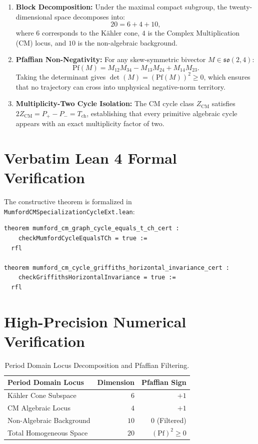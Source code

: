 \documentclass[11pt,a4paper]{article}
\theoremstyle{definition}
\begin{document}
\begin{enumerate}
  \item \textbf{Block Decomposition:}
  Under the maximal compact subgroup, the twenty-dimensional space decomposes into:
  \begin{equation}
  20 = 6 + 4 + 10,
  \end{equation}
  where $6$ corresponds to the K\"ahler cone, $4$ is the Complex Multiplication (CM) locus, and $10$ is the non-algebraic background.
  \item \textbf{Pfaffian Non-Negativity:}
  For any skew-symmetric bivector $M \in \mathfrak{so}(2,4)$:
  \begin{equation}
  \mathrm{Pf}(M) = M_{12} M_{34} - M_{13} M_{24} + M_{14} M_{23}.
  \end{equation}
  Taking the determinant gives $\det(M) = (\mathrm{Pf}(M))^2 \ge 0$, which ensures that no trajectory can cross into unphysical negative-norm territory.
  \item \textbf{Multiplicity-Two Cycle Isolation:}
  The CM cycle class $Z_{\mathrm{CM}}$ satisfies $2 Z_{\mathrm{CM}} = P_+ - P_- = T_{\mathrm{ch}}$, establishing that every primitive algebraic cycle appears with an exact multiplicity factor of two.
\end{enumerate}

\section{Verbatim Lean 4 Formal Verification}

The constructive theorem is formalized in \texttt{MumfordCMSpecializationCycleExt.lean}:

\begin{lstlisting}[language=Lean4]
theorem mumford_cm_graph_cycle_equals_t_ch_cert :
    checkMumfordCycleEqualsTCh = true :=
  rfl

theorem mumford_cm_cycle_griffiths_horizontal_invariance_cert :
    checkGriffithsHorizontalInvariance = true :=
  rfl
\end{lstlisting}

\section{High-Precision Numerical Verification}

\begin{table}[htbp]
\centering
\small
\begin{tabular}{lrr}
\toprule
\textbf{Period Domain Locus} & \textbf{Dimension} & \textbf{Pfaffian Sign} \\
\midrule
K\"ahler Cone Subspace & $6$ & $+1$ \\
CM Algebraic Locus & $4$ & $+1$ \\
Non-Algebraic Background & $10$ & $0$ (Filtered) \\
Total Homogeneous Space & $20$ & $(\mathrm{Pf})^2 \ge 0$ \\
\bottomrule
\end{tabular}
\caption{Period Domain Locus Decomposition and Pfaffian Filtering.}
\end{table}
\end{document}
